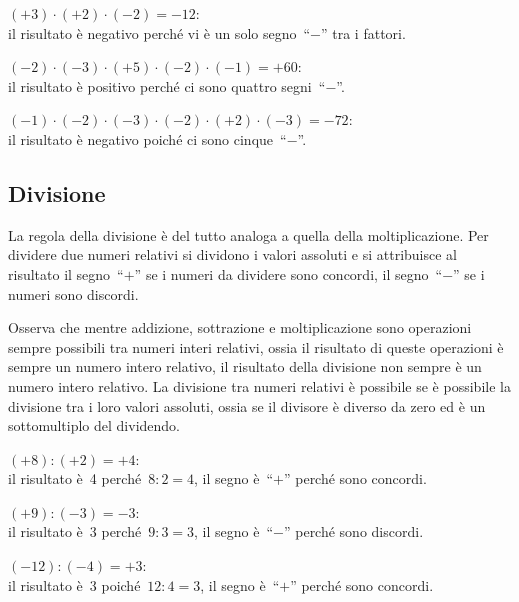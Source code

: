 \begin{exrig}
 \begin{esempio}
\((+3)\cdot (+2)\cdot (-2) =-12\): \\
il risultato è negativo perché vi è un solo segno~``\(-\)'' tra i fattori.
 \end{esempio}

 \begin{esempio}
\((-2)\cdot (-3)\cdot (+5)\cdot (-2)\cdot (-1) = +60\): \\ 
il risultato è positivo perché ci sono quattro segni~``\(-\)''.
 \end{esempio}

 \begin{esempio}
\((-1)\cdot (-2)\cdot (-3)\cdot (-2)\cdot (+2)\cdot (-3) = -72\): \\ 
il risultato è negativo poiché ci sono cinque~``\(-\)''.
 \end{esempio}
\end{exrig}


\subsection{Divisione}

La regola della divisione è del tutto analoga a quella della moltiplicazione.
Per dividere due numeri relativi si dividono i valori assoluti e si attribuisce
al risultato il segno~``\(+\)'' se i numeri da dividere sono concordi, il 
segno~``\(-\)'' se i numeri sono discordi.

Osserva che mentre addizione, sottrazione e moltiplicazione sono operazioni 
sempre possibili
tra numeri interi relativi, ossia il risultato di queste operazioni è sempre un 
numero intero
relativo, il risultato della divisione non sempre è un numero intero relativo. 
La divisione
tra numeri relativi è possibile se è possibile la divisione tra i loro valori 
assoluti, ossia se
il divisore è diverso da zero ed è un sottomultiplo del dividendo.
\newpage
\begin{exrig}
 \begin{esempio}
\((+8):(+2)=+4\): \\
il risultato è~4 perché~\(8:2=4\), il segno è~``\(+\)'' perché sono concordi.
 \end{esempio}

\begin{esempio}
\((+9):(-3)=-3\): \\ 
il risultato è~3 perché~\(9:3=3\), il segno è~``\(-\)'' perché sono discordi.
 \end{esempio}

\begin{esempio}
\((-12):(-4)=+3\): \\
il risultato è~3 poiché~\(12:4=3\), il segno è~``\(+\)'' perché sono concordi.
 \end{esempio}

\end{exrig}

